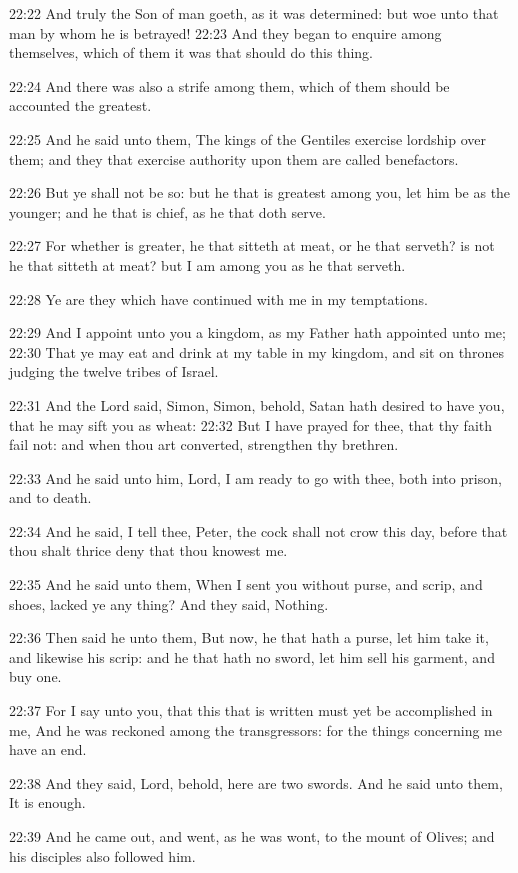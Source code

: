 22:22 And truly the Son of man goeth, as it was determined: but woe
unto that man by whom he is betrayed!  22:23 And they began to enquire
among themselves, which of them it was that should do this thing.

22:24 And there was also a strife among them, which of them should be
accounted the greatest.

22:25 And he said unto them, The kings of the Gentiles exercise
lordship over them; and they that exercise authority upon them are
called benefactors.

22:26 But ye shall not be so: but he that is greatest among you, let
him be as the younger; and he that is chief, as he that doth serve.

22:27 For whether is greater, he that sitteth at meat, or he that
serveth?  is not he that sitteth at meat? but I am among you as he
that serveth.

22:28 Ye are they which have continued with me in my temptations.

22:29 And I appoint unto you a kingdom, as my Father hath appointed
unto me; 22:30 That ye may eat and drink at my table in my kingdom,
and sit on thrones judging the twelve tribes of Israel.

22:31 And the Lord said, Simon, Simon, behold, Satan hath desired to
have you, that he may sift you as wheat: 22:32 But I have prayed for
thee, that thy faith fail not: and when thou art converted, strengthen
thy brethren.

22:33 And he said unto him, Lord, I am ready to go with thee, both
into prison, and to death.

22:34 And he said, I tell thee, Peter, the cock shall not crow this
day, before that thou shalt thrice deny that thou knowest me.

22:35 And he said unto them, When I sent you without purse, and scrip,
and shoes, lacked ye any thing? And they said, Nothing.

22:36 Then said he unto them, But now, he that hath a purse, let him
take it, and likewise his scrip: and he that hath no sword, let him
sell his garment, and buy one.

22:37 For I say unto you, that this that is written must yet be
accomplished in me, And he was reckoned among the transgressors: for
the things concerning me have an end.

22:38 And they said, Lord, behold, here are two swords. And he said
unto them, It is enough.

22:39 And he came out, and went, as he was wont, to the mount of
Olives; and his disciples also followed him.

